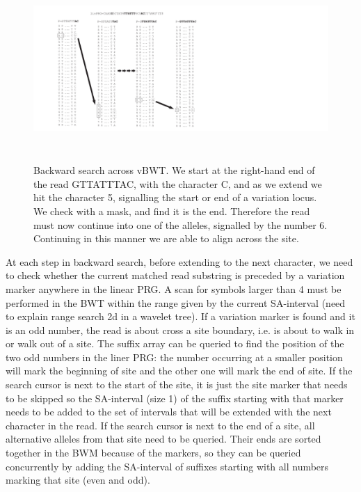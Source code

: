 \documentclass[runningheads,a4paper]{llncs}
\begin{document}
\begin{figure}
\centering
\includegraphics[height=7cm]{BWT.pdf}
\caption{Backward search across vBWT.  We start at the right-hand end of the read GTTATTTAC, with the character C, and as we extend we hit the character 5, signalling the start or end of a variation locus. We check with a mask, and find it is the end. Therefore the read must now continue into one of the alleles, signalled by the number 6. Continuing in this manner we are able to align across the site.}
\label{fig:example}
\end{figure}

At each step in backward search, before extending to the next character, we need to check whether the current matched read substring is preceded by a variation marker anywhere in the linear PRG. A scan for symbols larger than 4 must be performed in the BWT within the range given by the current SA-interval (need to explain range search 2d in a wavelet tree). If a variation marker is found and it is an odd number, the read is about cross a site boundary, i.e. is about to walk in or walk out of a site. The suffix array can be queried to find the position of the two odd numbers in the liner PRG: the number occurring at a smaller position will mark the beginning of site and the other one will mark the end of site. If the search cursor is next to the start of the site, it is just the site marker that needs to be skipped so the SA-interval (size 1) of the suffix starting with that marker needs to be added to the set of intervals that will be extended with the next character in the read. If the search cursor is next to the end of a site, all alternative alleles from that site need to be queried. Their ends are sorted together in the BWM because of the markers, so they can be queried concurrently by adding the SA-interval of suffixes starting with all numbers marking that site (even and odd). 
\end{document}
